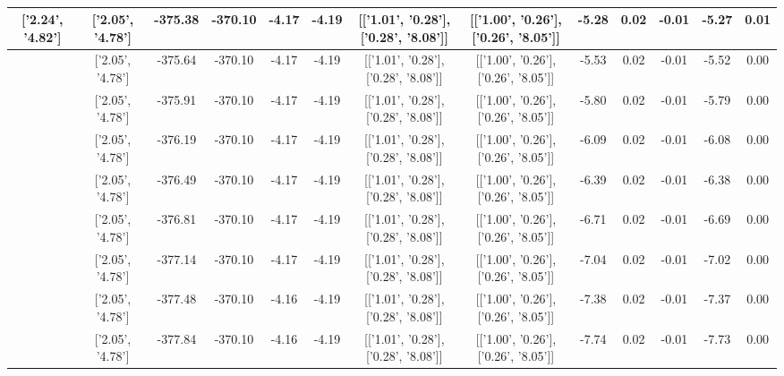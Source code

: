 \begin{table}[htbp]
\begin{adjustbox}{angle=90}
\begin{tabular}{|c|c|c|c|c|c|c|c|c|c|c|c|c|}
 ['2.24', '4.82'] & ['2.05', '4.78'] & -375.38 & -370.10 & -4.17 & -4.19 & [['1.01', '0.28'], ['0.28', '8.08']] & [['1.00', '0.26'], ['0.26', '8.05']] & -5.28 & 0.02 & -0.01 & -5.27 & 0.01\\ \hline
 ['2.25', '4.83'] & ['2.05', '4.78'] & -375.64 & -370.10 & -4.17 & -4.19 & [['1.01', '0.28'], ['0.28', '8.08']] & [['1.00', '0.26'], ['0.26', '8.05']] & -5.53 & 0.02 & -0.01 & -5.52 & 0.00\\ \hline
 ['2.27', '4.83'] & ['2.05', '4.78'] & -375.91 & -370.10 & -4.17 & -4.19 & [['1.01', '0.28'], ['0.28', '8.08']] & [['1.00', '0.26'], ['0.26', '8.05']] & -5.80 & 0.02 & -0.01 & -5.79 & 0.00\\ \hline
 ['2.28', '4.83'] & ['2.05', '4.78'] & -376.19 & -370.10 & -4.17 & -4.19 & [['1.01', '0.28'], ['0.28', '8.08']] & [['1.00', '0.26'], ['0.26', '8.05']] & -6.09 & 0.02 & -0.01 & -6.08 & 0.00\\ \hline
 ['2.29', '4.83'] & ['2.05', '4.78'] & -376.49 & -370.10 & -4.17 & -4.19 & [['1.01', '0.28'], ['0.28', '8.08']] & [['1.00', '0.26'], ['0.26', '8.05']] & -6.39 & 0.02 & -0.01 & -6.38 & 0.00\\ \hline
 ['2.30', '4.83'] & ['2.05', '4.78'] & -376.81 & -370.10 & -4.17 & -4.19 & [['1.01', '0.28'], ['0.28', '8.08']] & [['1.00', '0.26'], ['0.26', '8.05']] & -6.71 & 0.02 & -0.01 & -6.69 & 0.00\\ \hline
 ['2.31', '4.84'] & ['2.05', '4.78'] & -377.14 & -370.10 & -4.17 & -4.19 & [['1.01', '0.28'], ['0.28', '8.08']] & [['1.00', '0.26'], ['0.26', '8.05']] & -7.04 & 0.02 & -0.01 & -7.02 & 0.00\\ \hline
 ['2.32', '4.84'] & ['2.05', '4.78'] & -377.48 & -370.10 & -4.16 & -4.19 & [['1.01', '0.28'], ['0.28', '8.08']] & [['1.00', '0.26'], ['0.26', '8.05']] & -7.38 & 0.02 & -0.01 & -7.37 & 0.00\\ \hline
 ['2.34', '4.84'] & ['2.05', '4.78'] & -377.84 & -370.10 & -4.16 & -4.19 & [['1.01', '0.28'], ['0.28', '8.08']] & [['1.00', '0.26'], ['0.26', '8.05']] & -7.74 & 0.02 & -0.01 & -7.73 & 0.00\\ \hline
            \end{tabular}
        \end{adjustbox}
        \caption{}
        \label{}
    \end{table}
    